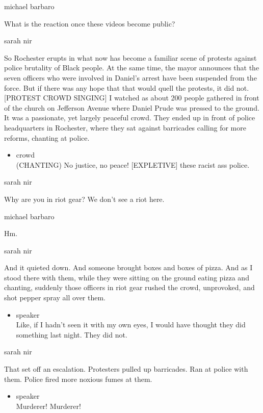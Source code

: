 michael barbaro

What is the reaction once these videos become public?

sarah nir

So Rochester erupts in what now has become a familiar scene of protests
against police brutality of Black people. At the same time, the mayor
announces that the seven officers who were involved in Daniel's arrest
have been suspended from the force. But if there was any hope that that
would quell the protests, it did not. {[}PROTEST CROWD SINGING{]} I
watched as about 200 people gathered in front of the church on Jefferson
Avenue where Daniel Prude was pressed to the ground. It was a
passionate, yet largely peaceful crowd. They ended up in front of police
headquarters in Rochester, where they sat against barricades calling for
more reforms, chanting at police.

\begin{itemize}
\tightlist
\item
  crowd\\
  (CHANTING) No justice, no peace! {[}EXPLETIVE{]} these racist ass
  police.
\end{itemize}

sarah nir

Why are you in riot gear? We don't see a riot here.

michael barbaro

Hm.

sarah nir

And it quieted down. And someone brought boxes and boxes of pizza. And
as I stood there with them, while they were sitting on the ground eating
pizza and chanting, suddenly those officers in riot gear rushed the
crowd, unprovoked, and shot pepper spray all over them.

\begin{itemize}
\tightlist
\item
  speaker\\
  Like, if I hadn't seen it with my own eyes, I would have thought they
  did something last night. They did not.
\end{itemize}

sarah nir

That set off an escalation. Protesters pulled up barricades. Ran at
police with them. Police fired more noxious fumes at them.

\begin{itemize}
\tightlist
\item
  speaker\\
  Murderer! Murderer!
\end{itemize}

